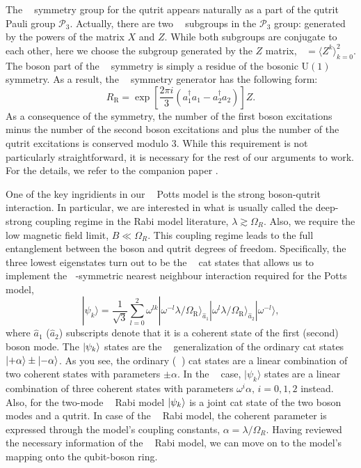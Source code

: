 \documentclass[reprint, aps, prx, amsmath, amssymb, longbibliography, superscriptaddress]{revtex4-2}
\DeclareMathOperator{\Zthree}{\mathbb{Z}_3}
\DeclareMathOperator{\Ztwo}{\mathbb{Z}_2}
\begin{document}
The $\Zthree$ symmetry group for the qutrit appears naturally as a part of the qutrit Pauli group $\mathcal{P}_3$. Actually, there are two $\Zthree$ subgroups in the $\mathcal{P}_3$ group: generated by the powers of the matrix $X$ and $Z$. While both subgroups are conjugate to each other, here we choose the subgroup generated by the $Z$ matrix, $\Zthree = \langle Z^k \rangle_{k=0}^2$. The boson part of the $\Zthree$ symmetry is simply a residue of the bosonic $\mathrm{U(1)}$ symmetry. As a result, the $\Zthree$ symmetry generator has the following form:
\begin{equation}
     R_{\text{R}} = \exp\left[\frac{2\pi i}{3}(a_1^{\dagger}  a_1 -  a_2^{\dagger}  a_2)\right] Z.
\end{equation}
As a consequence of the symmetry, the number of the first boson excitations minus the number of the second boson excitations and plus the number of the qutrit excitations is conserved modulo 3. While this requirement is not particularly straightforward, it is necessary for the rest of our arguments to work. For the details, we refer to the companion paper \cite{lotkov_cat_}.

One of the key ingridients in our $\Zthree$ Potts model is the strong boson-qutrit interaction. In particular, we are interested in what is usually called the deep-strong coupling regime in the Rabi model literature, $\lambda \gtrsim \Omega_R$. Also, we require the low magnetic field limit, $ B \ll \Omega_R$. This coupling regime leads to the full entanglement between the boson and qutrit degrees of freedom. Specifically, the three lowest eigenstates turn out to be the $\Zthree$ cat states \cite{lotkov_cat_} that allows us to implement the $\Zthree$-symmetric nearest neighbour interaction required for the Potts model,
\begin{equation}
\label{eq:three-cat-states}
    |\psi_k\rangle = \frac{1}{\sqrt{3}}\sum\limits_{l=0}^2 \omega^{lk}|\omega^{-l} \lambda/\Omega_{\text{R}}\rangle_{\hat a_1}|\omega^l \lambda/\Omega_{\text{R}}\rangle_{\hat a_2} |\omega^{-l} \rangle,
\end{equation}
where $\hat a_1$ ($\hat a_2$) subscripts denote that it is a coherent state of the first (second) boson mode.  The $\ket{\psi_k}$ states are the $\Zthree$ generalization of the ordinary cat states $\ket{+\alpha} \pm \ket{-\alpha}$. As you see, the ordinary ($\Ztwo$) cat states are a linear combination of two coherent states with parameters $\pm\alpha$. In the $\Zthree$ case, $|\psi_k\rangle$ states are a linear combination of three coherent states with parameters $\omega^i \alpha, \, i = 0,1,2$ instead. Also, for the two-mode $\Zthree$ Rabi model $\ket{\psi_k}$ is a joint cat state of the two boson modes and a qutrit. In case of the $\Zthree$ Rabi model, the coherent parameter is expressed through the model's coupling constants, $\alpha = \lambda/\Omega_R$. Having reviewed the necessary information of the $\Zthree$ Rabi model, we can move on to the model's mapping onto the qubit-boson ring.
\end{document}
